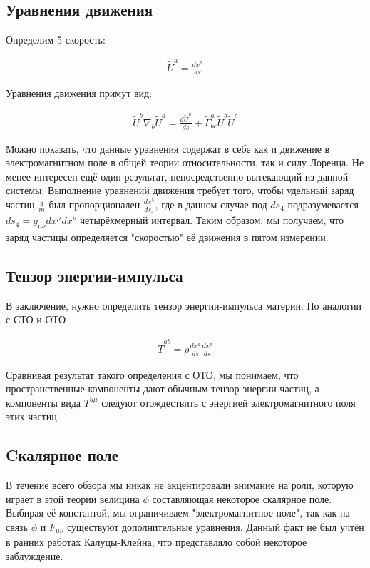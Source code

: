 \documentclass[a4paper,14pt]{article}
\begin{document}
\subsection*{Уравнения движения}

	Определим 5-скорость:

	\begin{align*}
	 	\tilde{U}^a = \frac{dx^a}{ds}
	\end{align*}

	Уравнения движения примут вид:

	\begin{align*}
	 \tilde{U}^b \nabla_b \tilde{U}^a = \frac{d \tilde{U}^a}{ds} + \tilde{\Gamma}_{bc}^a \tilde{U}^b \tilde{U}^c
	\end{align*}

	Можно показать, что данные уравнения содержат в себе как и движение в электромагнитном поле в общей теории относительности, так и силу Лоренца. Не менее интересен ещё один результат, непосредственно вытекающий из данной системы. Выполнение уравнений движения требует того, чтобы удельный заряд частиц $ \frac{q}{m} $ был пропорционален $ \frac{dx^5}{ds_4} $, где в данном случае под $ ds_4 $ подразумевается $ ds_4 = g_{\mu \nu} dx^{\mu} dx^{\nu} $ четырёхмерный интервал. Таким образом, мы получаем, что заряд частицы определяется "скоростью" её движения в пятом измерении.


\subsection*{Тензор энергии-импульса}

	В заключение, нужно определить тензор энергии-импульса материи. По аналогии с СТО и ОТО 

	\begin{align*}
	 	\tilde{T}^{ab} = \rho \frac{dx^a}{ds} \frac{dx^b}{ds}
	\end{align*}

	Сравнивая результат такого определения с ОТО, мы понимаем, что пространственные компоненты дают обычным тензор энергии частиц, а компоненты вида $ T^{5 \mu} $ следуют отождествить с энергией электромагнитного поля этих частиц.

\subsection*{Cкалярное поле}

	В течение всего обзора мы никак не акцентировали внимание на роли, которую играет в этой теории велицина $ \phi $ составляющая некоторое скалярное поле. Выбирая её константой, мы ограничиваем "электромагнитное поле", так как на связь $ \phi $ и $ F_{\mu \nu} $ существуют дополнительные уравнения. Данный факт не был учтён в ранних работах Калуцы-Клейна, что представляло собой некоторое заблуждение. 
\end{document}
